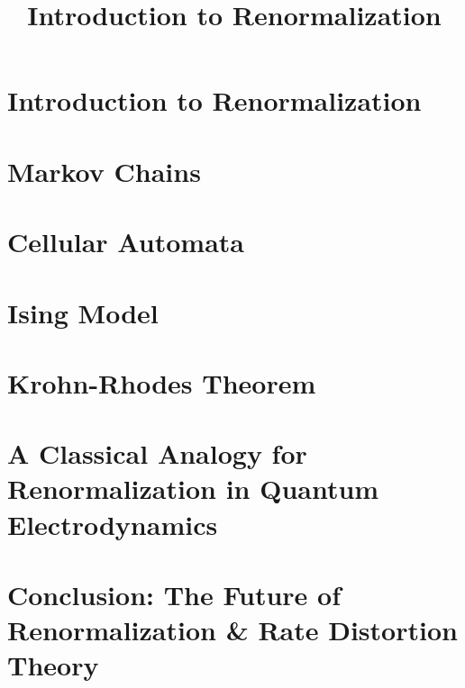 \documentclass[]{article}
\title{Introduction to Renormalization}
\author{}
\begin{document}
\maketitle

\begin{abstract}

\end{abstract}
\tableofcontents
\section{Introduction to Renormalization}
\section{Markov Chains}
\section{Cellular Automata}
\section{Ising Model}
\section{Krohn-Rhodes Theorem}
\section{A Classical Analogy for Renormalization in Quantum Electrodynamics}
\section{Conclusion: The Future of Renormalization \& Rate Distortion Theory}
\end{document}
